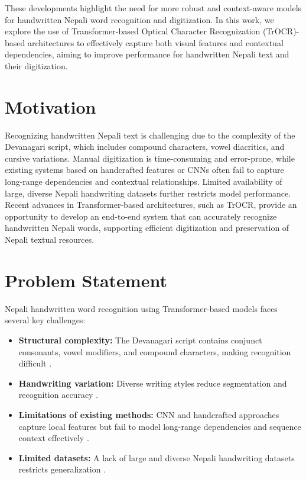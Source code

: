\noindent These developments highlight the need for more robust and context-aware models for handwritten Nepali word recognition and digitization. In this work, we explore the use of Transformer-based Optical Character Recognization (TrOCR)-based architectures to effectively capture both visual features and contextual dependencies, aiming to improve performance for handwritten Nepali text and their digitization.


        \section{Motivation}
Recognizing handwritten Nepali text is challenging due to the complexity of the Devanagari script, which includes compound characters, vowel diacritics, and cursive variations. Manual digitization is time-consuming and error-prone, while existing systems based on handcrafted features or CNNs often fail to capture long-range dependencies and contextual relationships. Limited availability of large, diverse Nepali handwriting datasets further restricts model performance. Recent advances in Transformer-based architectures, such as TrOCR, provide an opportunity to develop an end-to-end system that can accurately recognize handwritten Nepali words, supporting efficient digitization and preservation of Nepali textual resources.

        \section{Problem Statement}
Nepali handwritten word recognition using Transformer-based models faces several key challenges:

\begin{itemize}
    \item \textbf{Structural complexity:} The Devanagari script contains conjunct consonants, vowel modifiers, and compound characters, making recognition difficult \cite{baral2019handwritten,ghimire2020nepali}.
    
    \item \textbf{Handwriting variation:} Diverse writing styles reduce segmentation and recognition accuracy \cite{michael2019evaluating}.
    
    \item \textbf{Limitations of existing methods:} CNN and handcrafted approaches capture local features but fail to model long-range dependencies and sequence context effectively \cite{dosovitskiy2020image,li2023trocr}.
    
    \item \textbf{Limited datasets:} A lack of large and diverse Nepali handwriting datasets restricts generalization \cite{10.1007/978-3-030-86337-1_30,anand2023devanagari,rajak_indic_data}.
\end{itemize}

